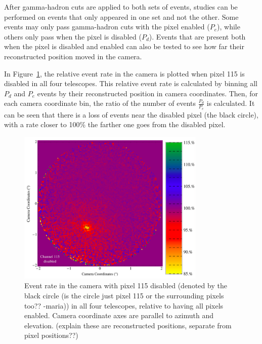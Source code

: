     After gamma-hadron cuts are applied to both sets of events, studies can be performed on events that only appeared in one set and not the other.
    Some events may only pass gamma-hadron cuts with the pixel enabled ($P_e$), while others only pass when the pixel is disabled ($P_d$).
    Events that are present both when the pixel is disabled and enabled can also be tested to see how far their reconstructed position moved in the camera.

    In Figure~\ref{fig:dpix_rel_camera}, the relative event rate in the camera is plotted when pixel 115 is disabled in all four telescopes.
    This relative event rate is calculated by binning all $P_d$ and $P_e$ events by their reconstructed position in camera coordinates.
    Then, for each camera coordinate bin, the ratio of the number of events $\frac{P_d}{P_e}$ is calculated.
    It can be seen that there is a loss of events near the disabled pixel (the black circle), with a rate closer to 100\% the farther one goes from the disabled pixel.

    \begin{figure}[!ht]
      \centering
      \includegraphics[width=0.8\textwidth]{images/disabled_pixel/relativerate_camera}
      \caption[Relative Event Rate After Disabling Camera Pixels]{
        Event rate in the camera with pixel 115 disabled (denoted by the {\color{red}black circle (is the circle just pixel 115 or the surrounding pixels too?? -maria)}) in all four telescopes, relative to having all pixels enabled.
        Camera coordinate axes are parallel to azimuth and elevation.
        {\color{red}(explain these are reconstructed positions, separate from pixel positions??)}
      }
      \label{fig:dpix_rel_camera}
    \end{figure}
    
